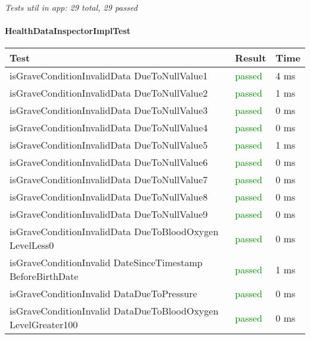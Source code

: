     
\noindent\textit{Tests util in app: 29 total, 29 passed}
\paragraph{HealthDataInspectorImplTest}

\begin{adjustwidth}{1cm}{}
        \begin{longtable}{|p{}|p{}|p{}|}
            \hline
            \textbf{Test} & \textbf{Result} & \textbf{Time} \\
            \hline
            isGraveConditionInvalidData DueToNullValue1 & \textcolor{green}{passed} & 4 ms \\
            \hline 
            isGraveConditionInvalidData DueToNullValue2 & \textcolor{green}{passed} & 1 ms \\
            \hline 
            isGraveConditionInvalidData DueToNullValue3 & \textcolor{green}{passed} & 0 ms \\
            \hline 
            isGraveConditionInvalidData DueToNullValue4 & \textcolor{green}{passed} & 0 ms \\
            \hline 
            isGraveConditionInvalidData DueToNullValue5 & \textcolor{green}{passed} & 1 ms \\
            \hline 
            isGraveConditionInvalidData DueToNullValue6 & \textcolor{green}{passed} & 0 ms \\
            \hline 
            isGraveConditionInvalidData DueToNullValue7 & \textcolor{green}{passed} & 0 ms \\
            \hline 
            isGraveConditionInvalidData DueToNullValue8 & \textcolor{green}{passed} & 0 ms \\
            \hline 
            isGraveConditionInvalidData DueToNullValue9 & \textcolor{green}{passed} & 0 ms \\
            \hline 
            isGraveConditionInvalidData DueToBloodOxygen LevelLess0 & \textcolor{green}{passed} & 0 ms \\
            \hline
            isGraveConditionInvalid DateSinceTimestamp BeforeBirthDate & \textcolor{green}{passed} & 1 ms \\
            \hline
            isGraveConditionInvalid DataDueToPressure & \textcolor{green}{passed} & 0 ms \\
            \hline
            isGraveConditionInvalid DataDueToBloodOxygen LevelGreater100 & \textcolor{green}{passed} & 0 ms \\
            \hline
        
        \end{longtable}
    \end{adjustwidth}


